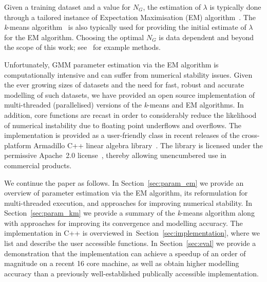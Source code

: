 Given a training dataset and a value for $N_G$,
the estimation of $\lambda$ is typically done through a
tailored instance of Expectation Maximisation (EM) algorithm~\cite{Dempster77, McLachlan-2008, Moon96, Redner84}.
The {\it k}-means algorithm~\cite{Bishop_2006,Duda01,Linde80} is also typically used for providing the initial estimate of $\lambda$ for the EM algorithm.
Choosing the optimal $N_G$ is data dependent and beyond the scope of this work; see~\cite{Hamerly_2003,Pelleg_2000} for example methods.

Unfortunately, GMM parameter estimation via the EM algorithm is computationally intensive
and can suffer from numerical stability issues.
Given the ever growing sizes of datasets and the need for fast, robust and accurate modelling of such datasets,
we have provided an open source implementation of multi-threaded (parallelised) versions 
of the \mbox{{\it k}-means} and EM algorithms.
In addition, core functions are recast in order to considerably reduce the likelihood of numerical instability due to floating point underflows and overflows.
The implementation is provided as a user-friendly class in recent releases of the cross-platform Armadillo C++ linear algebra library~\cite{Armadillo_JOSS_2016,Armadillo_PASC_2017}.
The library is licensed under the permissive Apache~2.0 license~\cite{Laurent_2008},
thereby allowing unencumbered use in commercial products.

We continue the paper as follows.
In Section~\ref{sec:param_em} we provide an overview of parameter estimation via the EM algorithm,
its reformulation for multi-threaded execution,
and approaches for improving numerical stability.
In Section~\ref{sec:param_km} we provide a summary of the {\it k}-means algorithm
along with approaches for improving its convergence and modelling accuracy.
The implementation in C++ is overviewed in~Section~\ref{sec:implementation},
where we list and describe the user accessible functions.
In Section~\ref{sec:eval}
we provide a demonstration that the implementation can achieve a speedup of an order of magnitude on a recent 16 core machine,
as well as obtain higher modelling accuracy than a previously well-established publically accessible implementation.




